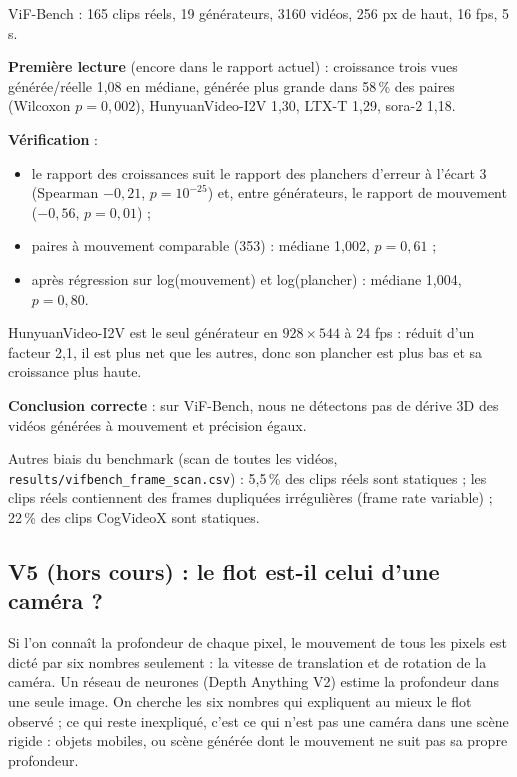 \documentclass[11pt,a4paper]{article}
\begin{document}
ViF-Bench : 165 clips réels, 19 générateurs, 3160 vidéos, 256 px de haut, 16 fps, 5 s.

\begin{resultat}
\textbf{Première lecture} (encore dans le rapport actuel) : croissance trois vues générée/réelle 1,08
en médiane, générée plus grande dans 58\,\% des paires (Wilcoxon $p=0{,}002$), HunyuanVideo-I2V 1,30,
LTX-T 1,29, sora-2 1,18.

\textbf{Vérification} :
\begin{itemize}
  \item le rapport des croissances suit le rapport des planchers d'erreur à l'écart 3 (Spearman
        $-0{,}21$, $p=10^{-25}$) et, entre générateurs, le rapport de mouvement ($-0{,}56$, $p=0{,}01$) ;
  \item paires à mouvement comparable (353) : médiane 1,002, $p=0{,}61$ ;
  \item après régression sur log(mouvement) et log(plancher) : médiane 1,004, $p=0{,}80$.
\end{itemize}
HunyuanVideo-I2V est le seul générateur en $928\times544$ à 24 fps : réduit d'un facteur 2,1, il est
plus net que les autres, donc son plancher est plus bas et sa croissance plus haute.

\textbf{Conclusion correcte} : sur ViF-Bench, nous ne détectons pas de dérive 3D des vidéos générées à
mouvement et précision égaux.
\end{resultat}

Autres biais du benchmark (scan de toutes les vidéos, \texttt{results/vifbench\_frame\_scan.csv}) :
5,5\,\% des clips réels sont statiques ; les clips réels contiennent des frames dupliquées irrégulières
(frame rate variable) ; 22\,\% des clips CogVideoX sont statiques.

\subsection{V5 (hors cours) : le flot est-il celui d'une caméra ?}

\begin{intuition}
Si l'on connaît la profondeur de chaque pixel, le mouvement de tous les pixels est dicté par six
nombres seulement : la vitesse de translation et de rotation de la caméra. Un réseau de neurones
(Depth Anything V2) estime la profondeur dans une seule image. On cherche les six nombres qui
expliquent au mieux le flot observé ; ce qui reste inexpliqué, c'est ce qui n'est pas une caméra
dans une scène rigide : objets mobiles, ou scène générée dont le mouvement ne suit pas sa propre
profondeur.
\end{intuition}
\end{document}
